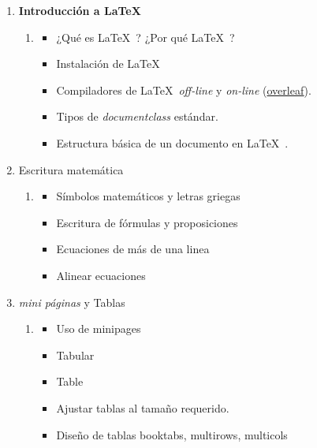 \documentclass[12pt]{article}
\begin{document}
\begin{enumerate}[label={\bfseries\arabic*.}]
\begin{enumerate}[start=1,label={\large\bfseries Módulo\ \arabic*:},leftmargin=2cm]
    \item \textbf{Introducción a \LaTeX\ }
    \begin{enumerate}[start=1,label={\bfseries Semana\ \arabic*:},leftmargin=1cm,rightmargin=.1\linewidth]
        \item
        \begin{itemize}
            \item ¿Qué es \LaTeX\ ? ¿Por qué \LaTeX\ ?
            \item Instalación de \LaTeX\  
            \item Compiladores de \LaTeX\  \textit{off-line} y \textit{on-line}  (\href{www.overleaf.com}{overleaf}).
            \item Tipos de \textit{documentclass} estándar.
            \item Estructura básica de un documento en \LaTeX\ .
        \end{itemize}
    \end{enumerate}
    \item Escritura matemática
    \begin{enumerate}[start=2,label={\bfseries Semana\ \arabic*:},leftmargin=1cm,rightmargin=.1\linewidth]
        \item
        \begin{itemize}
            \item Símbolos matemáticos y letras griegas
            \item Escritura de fórmulas y proposiciones
            \item Ecuaciones de más de una linea
            \item Alinear ecuaciones
        \end{itemize}
    \end{enumerate}
    \item \textit{mini páginas} y Tablas
    \begin{enumerate}[start=3,label={\bfseries Semana\ \arabic*:},leftmargin=1cm,rightmargin=.1\linewidth]
        \item
        \begin{itemize}
            \item Uso de minipages
            \item Tabular
            \item Table
            \item Ajustar tablas al tamaño requerido.
            \item Diseño de tablas booktabs, multirows, multicols

\end{itemize}
\end{enumerate}
\end{enumerate}
\end{enumerate}
\end{document}
